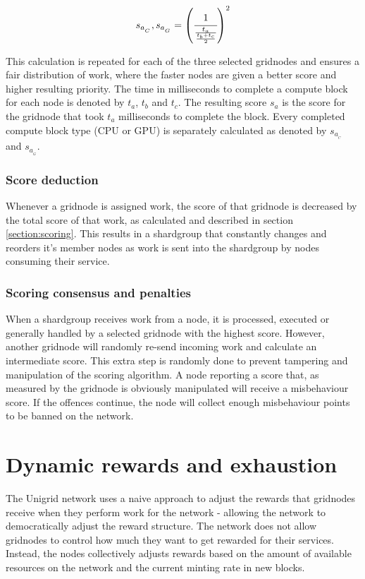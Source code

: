 \documentclass[10pt,a4paper,final]{article}
\begin{document}
\[
	\begin{array}{l}
	s_{a_{_C}}, s_{a_{_G}} = \left( \cfrac{1}{\frac{t_a}{\frac{t_b + t_c}{2}}} \right) ^2\\
	\end{array}	
\]

\noindent This calculation is repeated for each of the three selected \glspl{gridnode} and ensures a fair distribution of work, where the faster nodes are given a better score and higher resulting priority. The time in milliseconds to complete a compute block for each node is denoted by $t_{a}$, $t_{b}$ and $t_{c}$. The resulting score $s_{a}$ is the score for the \gls{gridnode} that took $t_{a}$ milliseconds to complete the block. Every completed compute block type (CPU or GPU) is separately calculated as denoted by $s_{a_{_C}}$ and $s_{a_{_G}}$.

\subsubsection{Score deduction}
Whenever a \gls{gridnode} is assigned work, the score of that \gls{gridnode} is decreased by the total score of that work, as calculated and described in section \ref{section:scoring}. This results in a \gls{shardgroup} that constantly changes and reorders it's member nodes as work is sent into the \gls{shardgroup} by nodes consuming their service.

\subsubsection{Scoring consensus and penalties}
\label{section:penalties}
When a \gls{shardgroup} receives work from a node, it is processed, executed or generally handled by a selected \gls{gridnode} with the highest score. However, another \gls{gridnode} will randomly re-send incoming work and calculate an intermediate score. This extra step is randomly done to prevent tampering and manipulation of the scoring algorithm. A node reporting a score that, as measured by the \gls{gridnode} is obviously manipulated will receive a misbehaviour score. If the offences continue, the node will collect enough misbehaviour points to be banned on the network.

\section{Dynamic rewards and exhaustion}
\label{section:dynreward}
The Unigrid network uses a naive approach to adjust the rewards that \glspl{gridnode} receive when they perform work for the network - allowing the network to democratically adjust the reward structure. The network does not allow \glspl{gridnode} to control how much they want to get rewarded for their services. Instead, the nodes collectively adjusts rewards based on the amount of available resources on the network and the current minting rate in new blocks.
\end{document}

